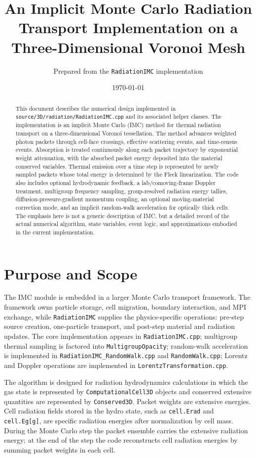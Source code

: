 \documentclass[11pt]{article}
\title{An Implicit Monte Carlo Radiation Transport Implementation on a Three-Dimensional Voronoi Mesh}
\author{Prepared from the \texttt{RadiationIMC} implementation}
\date{\today}
\newcounter{algorithm}
\begin{document}
\maketitle

\begin{abstract}
This document describes the numerical design implemented in
\texttt{source/3D/radiation/RadiationIMC.cpp} and its associated helper
classes. The implementation is an implicit Monte Carlo (IMC) method for
thermal radiation transport on a three-dimensional Voronoi tessellation. The
method advances weighted photon packets through cell-face crossings, effective
scattering events, and time-census events. Absorption is treated continuously
along each packet trajectory by exponential weight attenuation, with the
absorbed packet energy deposited into the material conserved variables. Thermal
emission over a time step is represented by newly sampled packets whose total
energy is determined by the Fleck linearization. The code also includes
optional hydrodynamic feedback, a lab/comoving-frame Doppler treatment,
multigroup frequency sampling, group-resolved radiation energy tallies,
diffusion-pressure-gradient momentum coupling, an optional moving-material
correction mode, and an implicit random-walk acceleration for optically thick
cells. The emphasis here is not a generic description of IMC, but a detailed
record of the actual numerical algorithm, state variables, event logic, and
approximations embodied in the current implementation.
\end{abstract}

\section{Purpose and Scope}

The IMC module is embedded in a larger Monte Carlo transport framework. The
framework owns particle storage, cell migration, boundary interaction, and MPI
exchange, while \texttt{RadiationIMC} supplies the physics-specific operations:
pre-step source creation, one-particle transport, and post-step material and
radiation updates. The core implementation appears in
\texttt{RadiationIMC.cpp}; multigroup thermal sampling is factored into
\texttt{MultigroupOpacity}; random-walk acceleration is implemented in
\texttt{RadiationIMC\_RandomWalk.cpp} and \texttt{RandomWalk.cpp}; Lorentz and
Doppler operations are implemented in \texttt{LorentzTransformation.cpp}.

The algorithm is designed for radiation hydrodynamics calculations in which
the gas state is represented by \texttt{ComputationalCell3D} objects and
conserved extensive quantities are represented by \texttt{Conserved3D}. Packet
weights are extensive energies. Cell radiation fields stored in the hydro
state, such as \texttt{cell.Erad} and \texttt{cell.Eg[g]}, are specific
radiation energies after normalization by cell mass. During the Monte Carlo
step the packet ensemble carries the extensive radiation energy; at the end of
the step the code reconstructs cell radiation energies by summing packet
weights in each cell.
\end{document}
